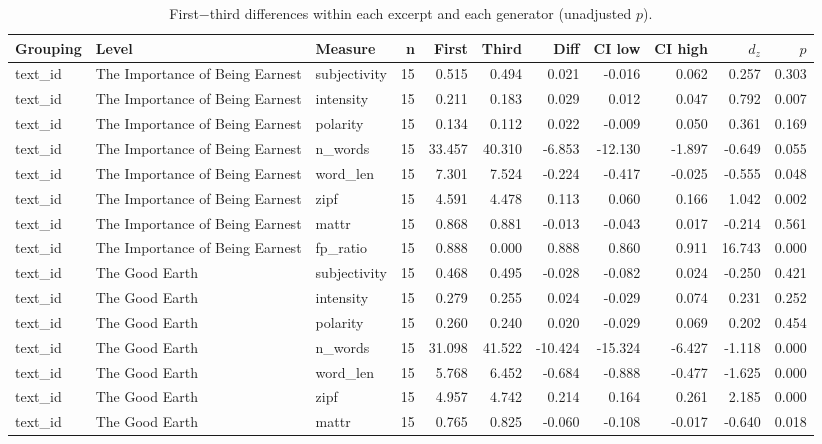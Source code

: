 \documentclass[10pt]{article}
\begin{document}
{\scriptsize
\begin{longtable}{lllrrrrrrrr}
\caption{First$-$third differences within each excerpt and each generator (unadjusted $p$).}\\
\toprule
Grouping & Level & Measure & n & First & Third & Diff & CI low & CI high & $d_z$ & $p$ \\
\midrule
\endhead
text\_id & The Importance of Being Earnest & subjectivity & 15 & 0.515 & 0.494 & 0.021 & -0.016 & 0.062 & 0.257 & 0.303 \\
text\_id & The Importance of Being Earnest & intensity & 15 & 0.211 & 0.183 & 0.029 & 0.012 & 0.047 & 0.792 & 0.007 \\
text\_id & The Importance of Being Earnest & polarity & 15 & 0.134 & 0.112 & 0.022 & -0.009 & 0.050 & 0.361 & 0.169 \\
text\_id & The Importance of Being Earnest & n\_words & 15 & 33.457 & 40.310 & -6.853 & -12.130 & -1.897 & -0.649 & 0.055 \\
text\_id & The Importance of Being Earnest & word\_len & 15 & 7.301 & 7.524 & -0.224 & -0.417 & -0.025 & -0.555 & 0.048 \\
text\_id & The Importance of Being Earnest & zipf & 15 & 4.591 & 4.478 & 0.113 & 0.060 & 0.166 & 1.042 & 0.002 \\
text\_id & The Importance of Being Earnest & mattr & 15 & 0.868 & 0.881 & -0.013 & -0.043 & 0.017 & -0.214 & 0.561 \\
text\_id & The Importance of Being Earnest & fp\_ratio & 15 & 0.888 & 0.000 & 0.888 & 0.860 & 0.911 & 16.743 & 0.000 \\
text\_id & The Good Earth & subjectivity & 15 & 0.468 & 0.495 & -0.028 & -0.082 & 0.024 & -0.250 & 0.421 \\
text\_id & The Good Earth & intensity & 15 & 0.279 & 0.255 & 0.024 & -0.029 & 0.074 & 0.231 & 0.252 \\
text\_id & The Good Earth & polarity & 15 & 0.260 & 0.240 & 0.020 & -0.029 & 0.069 & 0.202 & 0.454 \\
text\_id & The Good Earth & n\_words & 15 & 31.098 & 41.522 & -10.424 & -15.324 & -6.427 & -1.118 & 0.000 \\
text\_id & The Good Earth & word\_len & 15 & 5.768 & 6.452 & -0.684 & -0.888 & -0.477 & -1.625 & 0.000 \\
text\_id & The Good Earth & zipf & 15 & 4.957 & 4.742 & 0.214 & 0.164 & 0.261 & 2.185 & 0.000 \\
text\_id & The Good Earth & mattr & 15 & 0.765 & 0.825 & -0.060 & -0.108 & -0.017 & -0.640 & 0.018 \\

\end{longtable}}
\end{document}
